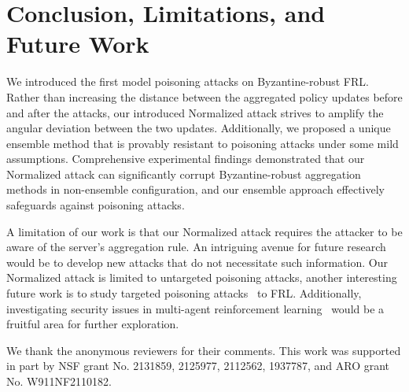 

\section{Conclusion, Limitations, and Future Work}



We introduced the first model poisoning attacks on Byzantine-robust FRL. Rather than increasing the distance between the aggregated policy updates before and after the attacks, our introduced Normalized attack strives to amplify the angular deviation between the two updates. Additionally, we proposed a unique ensemble method that is provably resistant to poisoning attacks under some mild assumptions. Comprehensive experimental findings demonstrated that our Normalized attack can significantly corrupt Byzantine-robust aggregation methods in non-ensemble configuration, and our ensemble approach effectively safeguards against poisoning attacks.


A limitation of our work is that our Normalized attack requires the attacker to be aware of the server's aggregation rule. An intriguing avenue for future research would be to develop new attacks that do not necessitate such information. 
Our Normalized attack is limited to untargeted poisoning attacks, another interesting future work is to study targeted poisoning attacks~\cite{bagdasaryan2020backdoor,wang2020attack,xie2019dba} to FRL.
Additionally, investigating security issues in multi-agent reinforcement learning~\cite{tan1993multi,bucsoniu2010multi,vinyals2019grandmaster,zhang2018fully,lin2020robustness,fang2024hardness} would be a fruitful area for further exploration.



\begin{acks}
We thank the anonymous reviewers for their comments. 
This work was supported in part by NSF grant No. 2131859, 2125977, 2112562, 1937787, and ARO grant No. W911NF2110182.
\end{acks}
